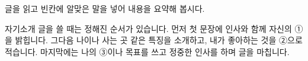 \documentclass[fs13,seriesSau]{korfarm-base}
\begin{document}
\kfActivityBg \par{}\par\nopagebreak[4]\smallskip\nopagebreak[4]
\begin{kfBlankList}
\kfBlankItem 글을 읽고 빈칸에 알맞은 말을 넣어 내용을 요약해 봅시다.

자기소개 글을 쓸 때는 정해진 순서가 있습니다.  먼저 첫 문장에 인사와 함께 자신의 ①\kfFillBlank[12mm]{}을 밝힙니다.   그다음 나이나 사는 곳 같은 특징을 소개하고, 내가 좋아하는 것을 ②\kfFillBlank[12mm]{}으로 적습니다.  마지막에는 나의 ③\kfFillBlank[12mm]{}이나 목표를 쓰고 정중한 인사를 하며 글을 마칩니다.
\end{kfBlankList}

\kfActivityBg \par{}\par\nopagebreak[4]\smallskip\nopagebreak[4]

\end{document}
